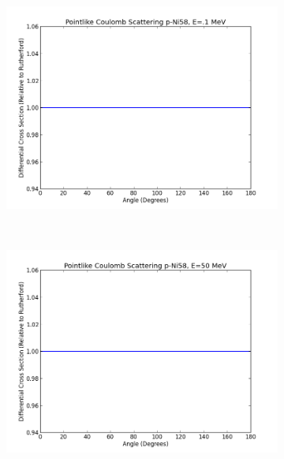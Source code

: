 \documentclass[paper=a4, fontsize=11pt]{scrartcl} %
\numberwithin{equation}{section} %
\numberwithin{figure}{section} %
\numberwithin{table}{section} %
\begin{document}
 \begin{figure}[hbt]
        \centering
        \begin{subfigure}[b!]{0.35\textwidth}
                \includegraphics[width=\textwidth]{PointlikeEpoint1.png}
        \end{subfigure}%
        ~ %
\quad
        \begin{subfigure}[b!]{0.35\textwidth}
                \includegraphics[width=\textwidth]{PointlikeE50.png}
        \end{subfigure}
\\
        ~ %

\end{figure}
\end{document}
